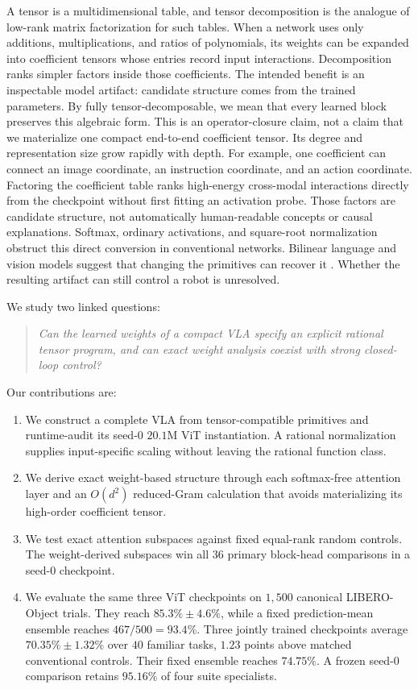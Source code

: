 \documentclass{article}
\begin{document}
A tensor is a multidimensional table, and tensor decomposition is the analogue of low-rank
matrix factorization for such tables. When a network uses only additions, multiplications, and
ratios of polynomials, its weights can be expanded into coefficient tensors whose entries record
input interactions. Decomposition ranks simpler factors inside those coefficients. The intended
benefit is an inspectable model artifact: candidate structure comes from the trained parameters.
By fully tensor-decomposable, we mean that every learned block preserves this algebraic form. This
is an operator-closure claim, not a claim that we materialize one compact end-to-end coefficient
tensor. Its degree and representation size grow rapidly with depth. For example, one coefficient
can connect an image coordinate, an instruction coordinate, and an action coordinate. Factoring
the coefficient table ranks high-energy cross-modal interactions directly from the checkpoint
without first fitting an activation probe. Those factors are candidate structure, not
automatically human-readable concepts or causal explanations.
Softmax, ordinary activations,
and square-root normalization obstruct this direct conversion in conventional networks.
Bilinear language and vision models suggest that changing the primitives can recover it
\cite{pearce,chinets}. Whether the resulting artifact can still control a robot is unresolved.

We study two linked questions:

\begin{quote}
\emph{Can the learned weights of a compact VLA specify an explicit rational tensor program,
and can exact weight analysis coexist with strong closed-loop control?}
\end{quote}

Our contributions are:

\begin{enumerate}
  \item We construct a complete VLA from tensor-compatible primitives and runtime-audit its
        seed-$0$ $20.1$M ViT instantiation. A rational normalization supplies input-specific scaling
        without leaving the rational function class.
  \item We derive exact weight-based structure through each softmax-free attention layer and an
        $O(d^2)$ reduced-Gram calculation that avoids materializing its high-order coefficient
        tensor.
  \item We test exact attention subspaces against fixed equal-rank random controls. The
        weight-derived subspaces win all $36$ primary block-head comparisons in a seed-$0$
        checkpoint.
  \item We evaluate the same three ViT checkpoints on $1{,}500$ canonical LIBERO-Object trials.
        They reach $85.3\%\pm4.6\%$, while a fixed prediction-mean ensemble reaches
        $467/500=93.4\%$. Three jointly trained checkpoints average
        $70.35\%\pm1.32\%$ over $40$ familiar tasks, $1.23$ points above matched
        conventional controls. Their fixed ensemble reaches
        $74.75\%$. A frozen seed-$0$ comparison retains $95.16\%$ of four suite specialists.
\end{enumerate}
\end{document}
